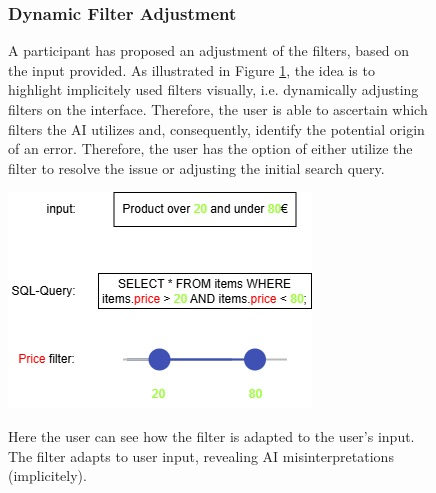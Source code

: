 \documentclass[../../submission.tex]{subfiles}
\begin{document}
\begin{figure}[h]
    \centering
    \begin{minipage}{0.40\textwidth}
    \subsubsection{Dynamic Filter Adjustment}
    A participant has proposed an adjustment of the filters, based on the input provided. As illustrated in Figure \ref{fig:filter}, 
    the idea is to highlight implicitely used filters visually, i.e. dynamically adjusting filters on the interface. 
    Therefore, the user is able to ascertain 
    which filters the AI utilizes and, consequently, identify the potential origin of an error. Therefore, the user 
    has the option of either utilize the filter to resolve the issue or adjusting the initial search query.       
    \end{minipage}
    \hfill
    \begin{minipage}{0.43\textwidth}
    \includegraphics[width=\textwidth]{images/filter}
    \caption{Here the user can see how the filter is adapted to the user's input. The filter adapts to user input, revealing AI misinterpretations (implicitely).}
    \Description{}
    \label{fig:filter} 
\end{minipage}
\end{figure}
\end{document}
